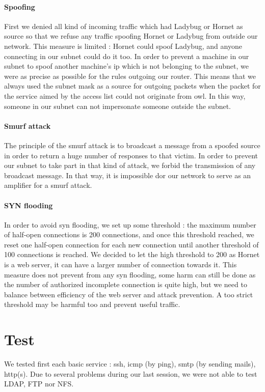 \documentclass[a4paper,titlepage]{article}
\begin{document}
\paragraph{Spoofing}
First we denied all kind of incoming traffic which had Ladybug or Hornet as source so that we refuse any traffic spoofing Hornet or Ladybug from outside our network. This measure is limited : Hornet could spoof Ladybug, and anyone connecting in our subnet could do it too. In order to  prevent a machine in our subnet to spoof another machine's ip which is not belonging to the subnet, we were as precise as possible for the rules outgoing our router. This means that we always used the subnet mask as a source for outgoing packets when the packet for the service aimed by the access list could not originate from owl.  In this way, someone in our subnet can not impersonate someone outside the subnet.
 
\paragraph{Smurf attack}
The principle of the smurf attack is to broadcast a message from a spoofed source in order to return a huge number of responses to that victim. 
In order to prevent our subnet to take part in that kind of attack, we forbid the transmission of any broadcast message. In that way, it is impossible dor our network to serve as an amplifier for a smurf attack.

\paragraph{SYN flooding}
In order to avoid syn flooding, we set up some threshold : the maximum number of half-open connections is 200 connections, and once this threshold reached, we reset one half-open connection for each new connection until another threshold of 100 connections is reached. We decided to let the high threshold to 200 as Hornet is a web server, it can have a larger number of connection towards it. This measure does not prevent from any syn flooding, some harm can still be done as the number of authorized incomplete connection is quite high, but we need to balance between efficiency of the web server and attack prevention. A too strict threshold may be harmful too and prevent useful traffic.    

\section{Test}
We tested first each basic service : ssh, icmp (by ping), smtp (by sending mails), http(s). Due to several problems during our last session, we were not able to test LDAP, FTP nor NFS. 
\end{document}
